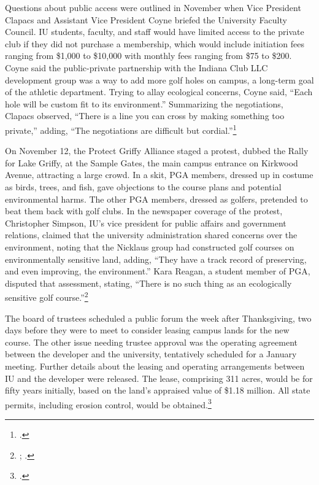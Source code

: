 \documentclass[
  american,
  letterpaper,
]{scrreprt}
\begin{document}
Questions about public access were outlined in November when Vice
President Clapacs and Assistant Vice President Coyne briefed the
University Faculty Council. IU students, faculty, and staff would have
limited access to the private club if they did not purchase a
membership, which would include initiation fees ranging from \$1,000 to
\$10,000 with monthly fees ranging from \$75 to \$200. Coyne said the
public-private partnership with the Indiana Club LLC development group
was a way to add more golf holes on campus, a long-term goal of the
athletic department. Trying to allay ecological concerns, Coyne said,
``Each hole will be custom fit to its environment.'' Summarizing the
negotiations, Clapacs observed, ``There is a line you can cross by
making something too private,'' adding, ``The negotiations are difficult
but cordial.''\footnote{.}

On November 12, the Protect Griffy Alliance staged a protest, dubbed the
Rally for Lake Griffy, at the Sample Gates, the main campus entrance on
Kirkwood Avenue, attracting a large crowd. In a skit, PGA members,
dressed up in costume as birds, trees, and fish, gave objections to the
course plans and potential environmental harms. The other PGA members,
dressed as golfers, pretended to beat them back with golf clubs. In the
newspaper coverage of the protest, Christopher Simpson, IU's vice
president for public affairs and government relations, claimed that the
university administration shared concerns over the environment, noting
that the Nicklaus group had constructed golf courses on environmentally
sensitive land, adding, ``They have a track record of preserving, and
even improving, the environment.'' Kara Reagan, a student member of PGA,
disputed that assessment, stating, ``There is no such thing as an
ecologically sensitive golf course.''\footnote{;
  .}

The board of trustees scheduled a public forum the week after
Thanksgiving, two days before they were to meet to consider leasing
campus lands for the new course. The other issue needing trustee
approval was the operating agreement between the developer and the
university, tentatively scheduled for a January meeting. Further details
about the leasing and operating arrangements between IU and the
developer were released. The lease, comprising 311 acres, would be for
fifty years initially, based on the land's appraised value of \$1.18
million. All state permits, including erosion control, would be
obtained.\footnote{.}
\end{document}
